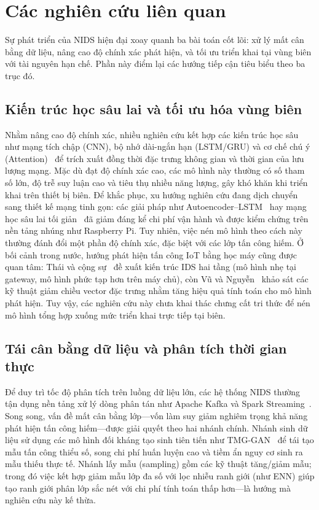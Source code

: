 \section{Các nghiên cứu liên quan}
Sự phát triển của NIDS hiện đại xoay quanh ba bài toán cốt lõi: xử lý mất cân bằng dữ liệu, nâng cao độ chính xác phát hiện, và tối ưu triển khai tại vùng biên với tài nguyên hạn chế. Phần này điểm lại các hướng tiếp cận tiêu biểu theo ba trục đó.

\subsection{Kiến trúc học sâu lai và tối ưu hóa vùng biên}
Nhằm nâng cao độ chính xác, nhiều nghiên cứu kết hợp các kiến trúc học sâu như mạng tích chập (CNN), bộ nhớ dài-ngắn hạn (LSTM/GRU) và cơ chế chú ý (Attention)~\cite{hu2024improved, ji2025hybrid} để trích xuất đồng thời đặc trưng không gian và thời gian của lưu lượng mạng. Mặc dù đạt độ chính xác cao, các mô hình này thường có số tham số lớn, độ trễ suy luận cao và tiêu thụ nhiều năng lượng, gây khó khăn khi triển khai trên thiết bị biên. Để khắc phục, xu hướng nghiên cứu đang dịch chuyển sang thiết kế mạng tinh gọn: các giải pháp như Autoencoder--LSTM~\cite{hejazi2025lightweight_botnet_iot} hay mạng học sâu lai tối giản~\cite{altaie2024hybrid_lightweight_ids} đã giảm đáng kể chi phí vận hành và được kiểm chứng trên nền tảng nhúng như Raspberry Pi. Tuy nhiên, việc nén mô hình theo cách này thường đánh đổi một phần độ chính xác, đặc biệt với các lớp tấn công hiếm. Ở bối cảnh trong nước, hướng phát hiện tấn công IoT bằng học máy cũng được quan tâm: Thái và cộng sự~\cite{thai2022twotier} đề xuất kiến trúc IDS hai tầng (mô hình nhẹ tại gateway, mô hình phức tạp hơn trên máy chủ), còn Vũ và Nguyễn~\cite{quang2025featurereduction} khảo sát các kỹ thuật giảm chiều vector đặc trưng nhằm tăng hiệu quả tính toán cho mô hình phát hiện. Tuy vậy, các nghiên cứu này chưa khai thác chưng cất tri thức để nén mô hình tổng hợp xuống mức triển khai trực tiếp tại biên.

\subsection{Tái cân bằng dữ liệu và phân tích thời gian thực}
Để duy trì tốc độ phân tích trên luồng dữ liệu lớn, các hệ thống NIDS thường tận dụng nền tảng xử lý dòng phân tán như Apache Kafka và Spark Streaming~\cite{kumar2025kafka_spark_ids}. Song song, vấn đề mất cân bằng lớp---vốn làm suy giảm nghiêm trọng khả năng phát hiện tấn công hiếm---được giải quyết theo hai nhánh chính. Nhánh sinh dữ liệu sử dụng các mô hình đối kháng tạo sinh tiên tiến như TMG-GAN~\cite{ding2024tmg, shamim2025gan_sdn_ids} để tái tạo mẫu tấn công thiểu số, song chi phí huấn luyện cao và tiềm ẩn nguy cơ sinh ra mẫu thiếu thực tế. Nhánh lấy mẫu (sampling) gồm các kỹ thuật tăng/giảm mẫu; trong đó việc kết hợp giảm mẫu lớp đa số với lọc nhiễu ranh giới (như ENN) giúp tạo ranh giới phân lớp sắc nét với chi phí tính toán thấp hơn---là hướng mà nghiên cứu này kế thừa.

